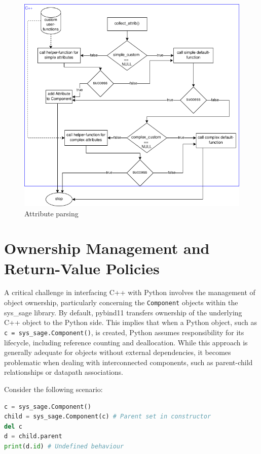 \begin{figure}[htpb]
    \centering
    \includegraphics[width=\textwidth]{figures/Attribute_from_xml.png}
    \caption{Attribute parsing}
    \label{fig:Attribute parsing}
\end{figure}
\newpage
\section{Ownership Management and Return-Value Policies}

A critical challenge in interfacing C++ with Python involves the management of object ownership, particularly concerning the \verb|Component| objects within the sys\_sage library. By default, pybind11 transfers ownership of the underlying C++ object to the Python side. This implies that when a Python object, such as \verb|c = sys_sage.Component()|, is created, Python assumes responsibility for its lifecycle, including reference counting and deallocation. While this approach is generally adequate for objects without external dependencies, it becomes problematic when dealing with interconnected components, such as parent-child relationships or datapath associations.

Consider the following scenario:

  \begin{lstlisting}[language=Python, xleftmargin=4em, frame = single]
c = sys_sage.Component()
child = sys_sage.Component(c) # Parent set in constructor
del c
d = child.parent
print(d.id) # Undefined behaviour
  \end{lstlisting}

